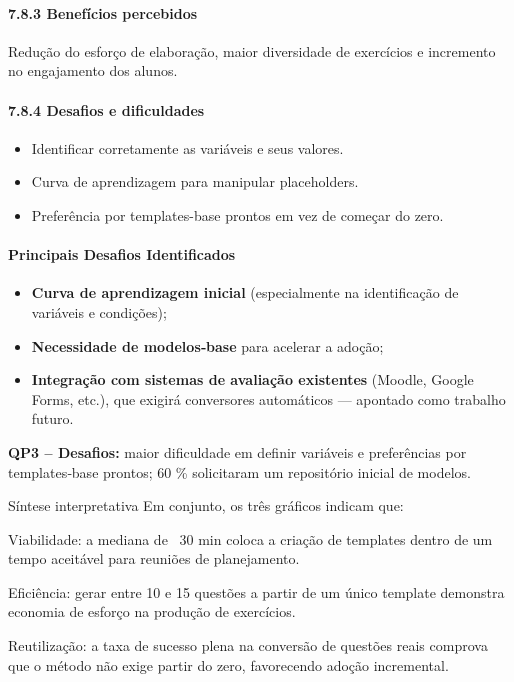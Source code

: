 \paragraph{\textbf{7.8.3 Benefícios percebidos}}

Redução do esforço de elaboração, maior diversidade de exercícios e incremento no engajamento dos alunos.

\paragraph{\textbf{7.8.4 Desafios e dificuldades}}

\begin{itemize}
    \item Identificar corretamente as variáveis e seus valores.
    \item Curva de aprendizagem para manipular placeholders.
    \item Preferência por templates-base prontos em vez de começar do zero.
\end{itemize}
 

\paragraph{\textbf{Principais Desafios Identificados}}

\begin{itemize}
    \item \textbf{Curva de aprendizagem inicial} (especialmente na identificação de variáveis e condições);
    \item \textbf{Necessidade de modelos‐base} para acelerar a adoção;
    \item \textbf{Integração com sistemas de avaliação existentes} (Moodle, Google Forms, etc.), que exigirá conversores automáticos — apontado como trabalho futuro.
\end{itemize}
\textbf{QP3 – Desafios:} maior dificuldade em definir variáveis e preferências por templates‐base prontos; 60 \% solicitaram um repositório inicial de modelos. 


Síntese interpretativa
Em conjunto, os três gráficos indicam que:

Viabilidade: a mediana de ~30 min coloca a criação de templates dentro de um tempo aceitável para reuniões de planejamento.

Eficiência: gerar entre 10 e 15 questões a partir de um único template demonstra economia de esforço na produção de exercícios.

Reutilização: a taxa de sucesso plena na conversão de questões reais comprova que o método não exige partir do zero, favorecendo adoção incremental.